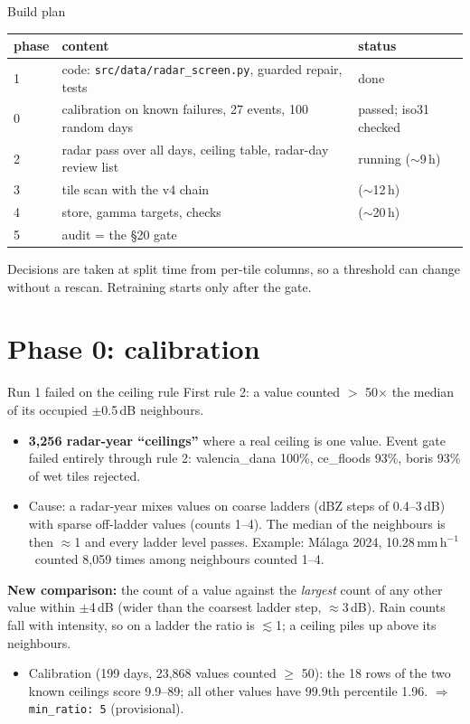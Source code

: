 \documentclass[aspectratio=169,10pt]{beamer}
\newcommand{\mmh}{\,mm\,h$^{-1}$}
\newcommand{\code}[1]{\texttt{\small #1}}
\begin{document}
\begin{frame}{Build plan}
  \small
  \begin{tabular}{lll}
    \toprule
    phase & content & status \\
    \midrule
    1 & code: \code{src/data/radar\_screen.py}, guarded repair, tests & done \\
    0 & calibration on known failures, 27 events, 100 random days & passed; iso31 checked \\
    2 & radar pass over all days, ceiling table, radar-day review list & running ($\sim$9\,h) \\
    3 & tile scan with the v4 chain & ($\sim$12\,h) \\
    4 & store, gamma targets, checks & ($\sim$20\,h) \\
    5 & audit = the §20 gate & \\
    \bottomrule
  \end{tabular}
  \vspace{2mm}

  Decisions are taken at split time from per-tile columns, so a threshold can change without
  a rescan. Retraining starts only after the gate.
\end{frame}

\section{Phase 0: calibration}

\begin{frame}{Run 1 failed on the ceiling rule}
  \small
  First rule 2: a value counted $>$ 50$\times$ the median of its occupied $\pm$0.5\,dB
  neighbours.
  \begin{itemize}
    \item \textbf{3,256 radar-year ``ceilings''} where a real ceiling is one value. Event gate
      failed entirely through rule 2: valencia\_dana 100\%, ce\_floods 93\%, boris 93\%
      of wet tiles rejected.
    \item Cause: a radar-year mixes values on coarse ladders (dBZ steps of 0.4--3\,dB) with
      sparse off-ladder values (counts 1--4). The median of the neighbours is then $\approx$1
      and every ladder level passes. Example: Málaga 2024, 10.28\mmh\ counted 8,059 times
      among neighbours counted 1--4.
  \end{itemize}
  \vspace{1mm}
  \textbf{New comparison:} the count of a value against the \emph{largest} count of any other
  value within $\pm$4\,dB (wider than the coarsest ladder step, $\approx$3\,dB). Rain counts
  fall with intensity, so on a ladder the ratio is $\lesssim$1; a ceiling piles up above its
  neighbours.
  \begin{itemize}
    \item Calibration (199 days, 23,868 values counted $\ge$ 50): the 18 rows of the two known
      ceilings score 9.9--89; all other values have 99.9th percentile 1.96.
      $\Rightarrow$ \code{min\_ratio: 5} (provisional).
  \end{itemize}
\end{frame}
\end{document}

